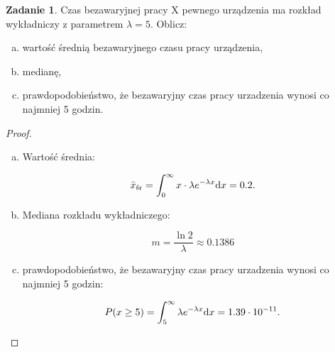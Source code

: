 \documentclass[11pt]{article}
\theoremstyle{definition}
\newtheorem{zadanie}{Zadanie}
\numberwithin{zadanie}{section}
\begin{document}
\begin{zadanie}
    Czas bezawaryjnej pracy X pewnego urządzenia ma rozkład wykładniczy z parametrem $\lambda = 5$. Oblicz:

    \begin{enumerate}[a)]
        \item wartość średnią bezawaryjnego czasu pracy urządzenia,
        \item medianę,
        \item prawdopodobieństwo, że bezawaryjny czas pracy urzadzenia wynosi co najmniej 5 godzin.
    \end{enumerate}
\end{zadanie}
\begin{proof}
    \begin{enumerate}[a)]
        \item Wartość średnia:

              $$\bar x_\text{śr} = \int_0^\infty x\cdot\lambda e^{-\lambda x}\text dx = 0.2.$$

        \item Mediana rozkładu wykładniczego:

              $$m=\frac{\ln 2}{\lambda} \approx 0.1386$$

        \item prawdopodobieństwo, że bezawaryjny czas pracy urzadzenia wynosi co najmniej 5 godzin:

              $$P(x\geq 5) = \int_5^\infty \lambda e^{-\lambda x}\text dx = 1.39\cdot10^{-11}.$$
    \end{enumerate}
\end{proof}
\end{document}
